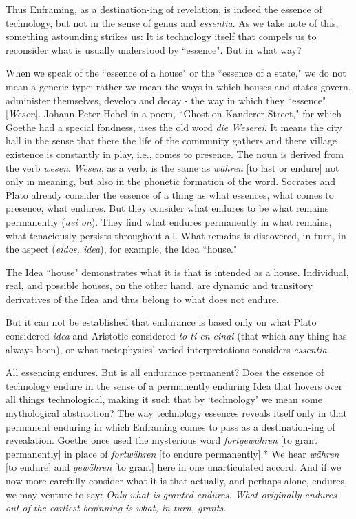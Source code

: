 \documentclass[12pt]{article}
\begin{document}
Thus Enframing, as a destination-ing of revelation, is indeed the essence of technology, but not in the sense of genus and \textit{essentia}. As we take note of this, something astounding strikes us: It is technology itself that compels us to reconsider what is usually understood by ``essence". But in what way?

When we speak of the ``essence of a house" or the ``essence of a state," we do not mean a generic type; rather we mean the ways in which houses and states govern, administer themselves, develop and decay - the way in which they ``essence" [\textit{Wesen}]. Johann Peter Hebel in a poem, ``Ghost on Kanderer Street," for which Goethe had a special fondness, uses the old word \textit{die Weserei}. It means the city hall in the sense that there the life of the community gathers and there village existence is constantly in play, i.e., comes to presence. The noun is derived from the verb \textit{wesen}. \textit{Wesen}, as a verb, is the same as \textit{w{\"a}hren} [to last or endure] not only in meaning, but also in the phonetic formation of the word. Socrates and Plato already consider the essence of a thing as what essences, what comes to presence, what endures. But they consider what endures to be what remains permanently (\textit{aei on}). They find what endures permanently in what remains, what tenaciously persists throughout all. What remains is discovered, in turn, in the aspect (\textit{eidos, idea}), for example, the Idea ``house."

The Idea ``house" demonstrates what it is that is intended as a house. Individual, real, and possible houses, on the other hand, are dynamic and transitory derivatives of the Idea and thus belong to what does not endure.

But it can not be established that endurance is based only on what Plato considered \textit{idea} and Aristotle considered \textit{to ti {\-e}n einai} (that which any thing has always been), or what metaphysics' varied interpretations considers \textit{essentia}.

All essencing endures. But is all endurance permanent? Does the essence of technology endure in the sense of a permanently enduring Idea that hovers over all things technological, making it such that by `technology' we mean some mythological abstraction? The way technology essences reveals itself only in that permanent enduring in which Enframing comes to pass as a destination-ing of revealation. Goethe once used the mysterious word \textit{fortgew{\"a}hren} [to grant permanently] in place of \textit{fortw{\"a}hren} [to endure permanently].* We hear \textit{w{\"a}hren} [to endure] and \textit{gew{\"a}hren} [to grant] here in one unarticulated accord. And if we now more carefully consider what it is that actually, and perhaps alone, endures, we may venture to say: \textit{Only what is granted endures. What originally endures out of the earliest beginning is what, in turn, grants}. 
\end{document}
